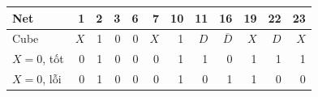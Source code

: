 \begin{tabular}{@{}lrrrrrrrrrrr@{}}
\toprule
Net & 1 & 2 & 3 & 6 & 7 & 10 & 11 & 16 & 19 & 22 & 23\\
\midrule
Cube & $X$ & 1 & 0 & 0 & $X$ & 1 & $D$ & $\overline D$ & $X$ & $D$ & $X$\\
$X=0$, tốt & 0 & 1 & 0 & 0 & 0 & 1 & 1 & 0 & 1 & 1 & 1\\
$X=0$, lỗi & 0 & 1 & 0 & 0 & 0 & 1 & 0 & 1 & 1 & 0 & 0\\
\bottomrule
\end{tabular}
